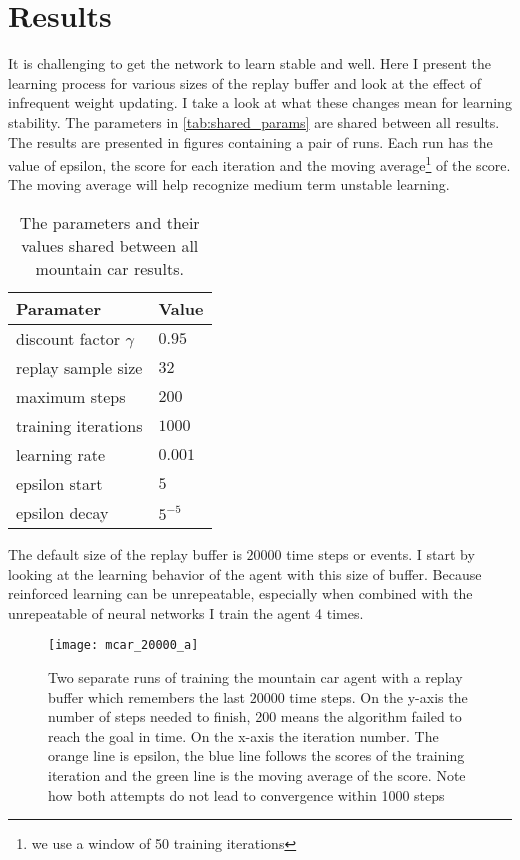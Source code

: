 \clearpage
\section{Results}

It is challenging to get the network to learn stable and well. Here I present the learning process for various sizes of the replay buffer and look at the effect of infrequent weight updating. I take a look at what these changes mean for learning stability. The parameters in \autoref{tab:shared_params} are shared between all results. The results are presented in figures containing a pair of runs. Each run has the value of epsilon, the score for each iteration and the moving average\footnote{we use a window of 50 training iterations} of the score. The moving average will help recognize medium term unstable learning.

\begin{table}[ht]
  \centering
  \selectfont
  \begin{tabular}{ll}
    \toprule
    Paramater & Value \\
    \midrule
    discount factor $\gamma$ & $0.95$ \\
    replay sample size & $32$ \\
    maximum steps & $200$ \\
    training iterations & $1000$ \\
    learning rate & $0.001$ \\
    epsilon start & $5$ \\
    epsilon decay & $5^{-5}$ \\
    \bottomrule
  \end{tabular}
  \caption{The parameters and their values shared between all mountain car results.}
  \label{tab:shared_params}
\end{table}

The default size of the replay buffer is $20000$ time steps or events. I start by looking at the learning behavior of the agent with this size of buffer. Because reinforced learning can be unrepeatable, especially when combined with the unrepeatable of neural networks I train the agent 4 times. 

\begin{figure}
    \texttt{[image: mcar\_20000\_a]}
    \caption{Two separate runs of training the mountain car agent with a replay buffer which remembers the last $20000$ time steps. On the y-axis the number of steps needed to finish, 200 means the algorithm failed to reach the goal in time. On the x-axis the iteration number. The orange line is epsilon, the blue line follows the scores of the training iteration and the green line is the moving average of the score. Note how both attempts do not lead to convergence within 1000 steps}
    \label{fig:mcar_20k_a}
\end{figure}

